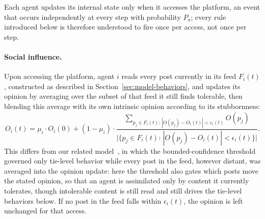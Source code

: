 \documentclass{svproc}
\begin{document}
Each agent updates its internal state only when it accesses the platform, an event that occurs independently at every step with probability $P_a$; every rule introduced below is therefore understood to fire once per access, not once per step.

\paragraph{Social influence.} Upon accessing the platform, agent $i$ reads every post currently in its feed $F_i(t)$, constructed as described in Section~\ref{sec:model-behaviors}, and updates its opinion by averaging over the subset of that feed it still finds tolerable, then blending this average with its own intrinsic opinion according to its stubbornness:
\begin{equation}
O_i(t) = \mu_i\cdot O_i(0) + (1-\mu_i)\cdot\frac{\sum_{p_j\in F_i(t):\,|O(p_j)-O_i(t)|<\epsilon_i(t)} O(p_j)}{\big|\{p_j\in F_i(t):\,|O(p_j)-O_i(t)|<\epsilon_i(t)\}\big|}.
\label{eq:opinion}
\end{equation}
This differs from our related model~\cite{takeda2026backfire}, in which the bounded-confidence threshold governed only tie-level behavior while every post in the feed, however distant, was averaged into the opinion update: here the threshold also gates which posts move the stated opinion, so that an agent is assimilated only by content it currently tolerates, though intolerable content is still read and still drives the tie-level behaviors below. If no post in the feed falls within $\epsilon_i(t)$, the opinion is left unchanged for that access.
\end{document}

